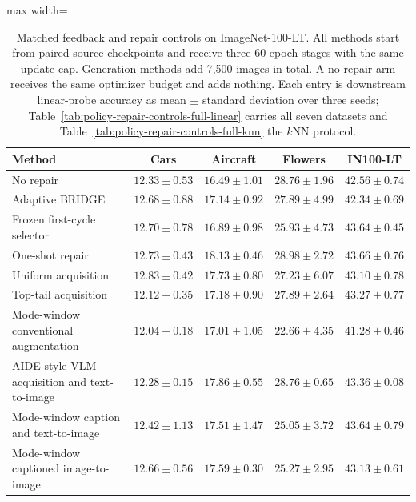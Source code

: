 \begin{table}[t]
\centering
\small
\setlength{\tabcolsep}{4.5pt}
\caption{Matched feedback and repair controls on ImageNet-100-LT. All methods start from paired source checkpoints and receive three 60-epoch stages with the same update cap. Generation methods add 7,500 images in total. A no-repair arm receives the same optimizer budget and adds nothing. Each entry is downstream linear-probe accuracy as mean $\pm$ standard deviation over three seeds; Table~\ref{tab:policy-repair-controls-full-linear} carries all seven datasets and Table~\ref{tab:policy-repair-controls-full-knn} the $k$NN protocol.}
\label{tab:policy-repair-controls}
\begin{adjustbox}{max width=\textwidth}
\begin{tabular}{lcccc}
\toprule
Method & Cars & Aircraft & Flowers & IN100-LT \\
\midrule
No repair & $12.33\pm0.53$ & $16.49\pm1.01$ & $28.76\pm1.96$ & $42.56\pm0.74$ \\
Adaptive BRIDGE & $12.68\pm0.88$ & $17.14\pm0.92$ & $27.89\pm4.99$ & $42.34\pm0.69$ \\
Frozen first-cycle selector & $12.70\pm0.78$ & $16.89\pm0.98$ & $25.93\pm4.73$ & $43.64\pm0.45$ \\
One-shot repair & $12.73\pm0.43$ & $\mathbf{18.13\pm0.46}$ & $\mathbf{28.98\pm2.72}$ & $\mathbf{43.66\pm0.76}$ \\
Uniform acquisition & $\mathbf{12.83\pm0.42}$ & $17.73\pm0.80$ & $27.23\pm6.07$ & $43.10\pm0.78$ \\
Top-tail acquisition & $12.12\pm0.35$ & $17.18\pm0.90$ & $27.89\pm2.64$ & $43.27\pm0.77$ \\
Mode-window conventional augmentation & $12.04\pm0.18$ & $17.01\pm1.05$ & $22.66\pm4.35$ & $41.28\pm0.46$ \\
AIDE-style VLM acquisition and text-to-image & $12.28\pm0.15$ & $17.86\pm0.55$ & $28.76\pm0.65$ & $43.36\pm0.08$ \\
Mode-window caption and text-to-image & $12.42\pm1.13$ & $17.51\pm1.47$ & $25.05\pm3.72$ & $43.64\pm0.79$ \\
Mode-window captioned image-to-image & $12.66\pm0.56$ & $17.59\pm0.30$ & $25.27\pm2.95$ & $43.13\pm0.61$ \\
\bottomrule
\end{tabular}
\end{adjustbox}
\end{table}
